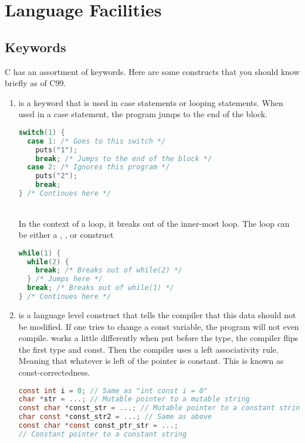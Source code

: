 \section{Language Facilities}

\subsection{Keywords}

C has an assortment of keywords.
Here are some constructs that you should know briefly as of C99.

\begin{enumerate}
	\item {} is a keyword that is used in case statements or looping statements. When used in a case statement, the program jumps to the end of the block.
	      \\
	      \begin{lstlisting}[language=C]
switch(1) {
  case 1: /* Goes to this switch */
    puts("1");
    break; /* Jumps to the end of the block */
  case 2: /* Ignores this program */
    puts("2");
    break;
} /* Continues here */
\end{lstlisting}
	      \\
	      In the context of a loop, it breaks out of the inner-most loop. The loop can be either a , , or  construct
	      \\
	      \begin{lstlisting}[language=C]
while(1) {
  while(2) {
    break; /* Breaks out of while(2) */
  } /* Jumps here */
  break; /* Breaks out of while(1) */
} /* Continues here */
\end{lstlisting}
	    \item {} is a language level construct that tells the compiler that this data should not be modified.
        If one tries to change a const variable, the program will not even compile.
         works a little differently when put before the type, the compiler flips the first type and const.
        Then the compiler uses a left associativity rule.
        Meaning that whatever is left of the pointer is constant.
        This is known as const-correctedness.
	      \\
	      \begin{lstlisting}[language=C]
const int i = 0; // Same as "int const i = 0"
char *str = ...; // Mutable pointer to a mutable string
const char *const_str = ...; // Mutable pointer to a constant string
char const *const_str2 = ...; // Same as above
const char *const const_ptr_str = ...;
// Constant pointer to a constant string
\end{lstlisting}


\end{enumerate}
